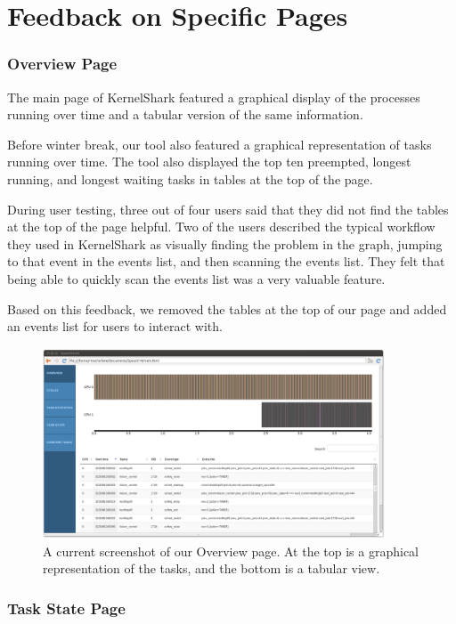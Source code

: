 \documentclass{hmcclinic}
\begin{document}
\section{Feedback on Specific Pages} %

\subsubsection{Overview Page}

The main page of KernelShark featured a graphical display of the processes
running over time and a tabular version of the same information.

Before winter break, our tool also featured a graphical representation of tasks
running over time. The tool also displayed the top ten preempted, longest
running, and longest waiting tasks in tables at the top of the page. 

During user testing, three out of four users said that they did not find the
tables at the top of the page helpful. Two of the users described the typical
workflow they used in KernelShark as visually finding the problem in the graph,
jumping to that event in the events list, and then scanning the events list.
They felt that being able to quickly scan the events list was a very valuable
feature.

Based on this feedback, we removed the tables at the top of our page and added
an events list for users to interact with.

\begin{figure}[H]
\begin{center}
\includegraphics[width=4in]{overview-page.png}
\caption{A current screenshot of our Overview page. At the top is a graphical
representation of the tasks, and the bottom is a tabular view.}
\end{center}
\end{figure}

\subsubsection{Task State Page}
\end{document}
